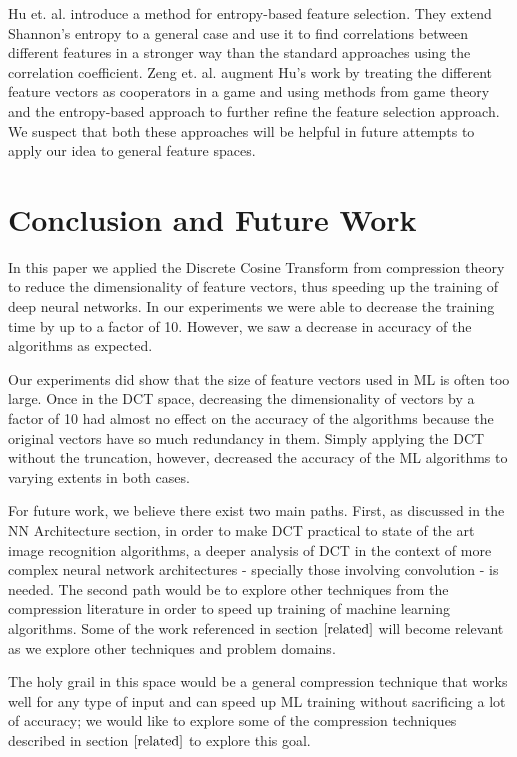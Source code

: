 \documentclass[12pt]{article}
\begin{document}
Hu et. al. \cite{hu} introduce a method for entropy-based feature selection.  They extend Shannon's entropy to a general case and use it to find correlations between different features in a stronger way than the standard approaches using the correlation coefficient.  Zeng et. al. \cite{zeng} augment Hu's work by treating the different feature vectors as cooperators in a game and using methods from game theory and the entropy-based approach to further refine the feature selection approach.  We suspect that both these approaches will be helpful in future attempts to apply our idea to general feature spaces.

\section{Conclusion and Future Work} \label{conclusion}

In this paper we applied the Discrete Cosine Transform from compression theory to reduce the dimensionality of feature vectors, thus speeding up the training of deep neural networks. In our experiments we were able to decrease the training time by up to a factor of 10. However, we saw a decrease in accuracy of the algorithms as expected.

Our experiments did show that the size of feature vectors used in ML is often too large. Once in the DCT space, decreasing the dimensionality of vectors by a factor of 10 had almost no effect on the accuracy of the algorithms because the original vectors have so much redundancy in them. Simply applying the DCT without the truncation, however, decreased the accuracy of the ML algorithms to varying extents in both cases.

For future work, we believe there exist two main paths. First, as discussed in the NN Architecture section, in order to make DCT practical to state of the art image recognition algorithms, a deeper analysis of DCT in the context of more complex neural network architectures - specially those involving convolution - is needed. The second path would be to explore other techniques from the compression literature in order to speed up training of machine learning algorithms.  Some of the work referenced in section $\ref{related}$ will become relevant as we explore other techniques and problem domains.

The holy grail in this space would be a general compression technique that works well for any type of input and can speed up ML training without sacrificing a lot of accuracy; we would like to explore some of the compression techniques described in section $\ref{related}$ to explore this goal.
\end{document}
